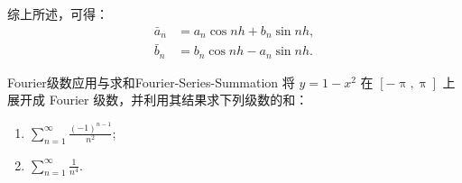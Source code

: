 \begin{myproof}
    综上所述，可得：
    \begin{equation}
        \boxed{
            \begin{aligned}
                \bar{a}_n & = a_n \cos nh + b_n \sin nh, \\
                \bar{b}_n & = b_n \cos nh - a_n \sin nh.
            \end{aligned}
        }
    \end{equation}
\end{myproof}

\begin{problem}{Fourier级数应用与求和}{Fourier-Series-Summation}
    将 $y = 1 - x^2$ 在 $[-\uppi, \uppi]$ 上展开成 Fourier 级数，并利用其结果求下列级数的和：
    \begin{enumerate}
        \item $\sum_{n=1}^{\infty} \frac{(-1)^{n-1}}{n^2}$;
        \item $\sum_{n=1}^{\infty} \frac{1}{n^4}$.
    \end{enumerate}
\end{problem}

